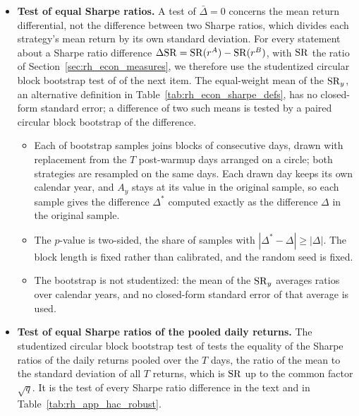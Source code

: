 \begin{itemize}
\item \textbf{Test of equal Sharpe ratios.} A test of $\bar\Delta = 0$ concerns the mean return differential, not the difference between two Sharpe ratios, which divides each strategy's mean return by its own standard deviation. For every statement about a Sharpe ratio difference $\Delta\mathrm{SR} = \mathrm{SR}(r^A) - \mathrm{SR}(r^B)$, with $\mathrm{SR}$ the ratio of Section~\ref{sec:rh_econ_measures}, we therefore use the studentized circular block bootstrap test of \citet{LedoitWolf2008} of the next item. The equal-weight mean of the $\mathrm{SR}_y$, an alternative definition in Table~\ref{tab:rh_econ_sharpe_defs}, has no closed-form standard error; a difference of two such means is tested by a paired circular block bootstrap of the difference.
  \begin{itemize}
  \item Each of \rheBootN{} bootstrap samples joins blocks of \rheBootBlock{} consecutive days, drawn with replacement from the $T$ post-warmup days arranged on a circle; both strategies are resampled on the same days. Each drawn day keeps its own calendar year, and $A_y$ stays at its value in the original sample, so each sample gives the difference $\Delta^{*}$ computed exactly as the difference $\Delta$ in the original sample.
  \item The $p$-value is two-sided, the share of samples with $|\Delta^{*} - \Delta| \ge |\Delta|$. The block length is fixed rather than calibrated, and the random seed is fixed.
  \item The bootstrap is not studentized: the mean of the $\mathrm{SR}_y$ averages ratios over calendar years, and no closed-form standard error of that average is used.
  \end{itemize}
\item \textbf{Test of equal Sharpe ratios of the pooled daily returns.} The studentized circular block bootstrap test of \citet{LedoitWolf2008} tests the equality of the Sharpe ratios of the daily returns pooled over the $T$ days, the ratio of the mean to the standard deviation of all $T$ returns, which is $\mathrm{SR}$ up to the common factor $\sqrt{q}$. It is the test of every Sharpe ratio difference in the text and in Table~\ref{tab:rh_app_hac_robust}.

\end{itemize}
